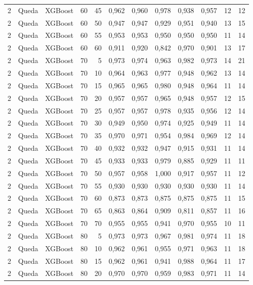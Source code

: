 \begin{longtable}{@{}rllrrrrrrrrr@{}}
2 & Queda & XGBoost & 60 & 45 & 0,962 & 0,960 & 0,978 & 0,938 & 0,957 & 12 & 12 \\
2 & Queda & XGBoost & 60 & 50 & 0,947 & 0,947 & 0,929 & 0,951 & 0,940 & 13 & 15 \\
2 & Queda & XGBoost & 60 & 55 & 0,953 & 0,953 & 0,950 & 0,950 & 0,950 & 11 & 14 \\
2 & Queda & XGBoost & 60 & 60 & 0,911 & 0,920 & 0,842 & 0,970 & 0,901 & 13 & 17 \\
2 & Queda & XGBoost & 70 & 5 & 0,973 & 0,974 & 0,963 & 0,982 & 0,973 & 14 & 21 \\
2 & Queda & XGBoost & 70 & 10 & 0,964 & 0,963 & 0,977 & 0,948 & 0,962 & 13 & 14 \\
2 & Queda & XGBoost & 70 & 15 & 0,965 & 0,965 & 0,980 & 0,948 & 0,964 & 11 & 14 \\
2 & Queda & XGBoost & 70 & 20 & 0,957 & 0,957 & 0,965 & 0,948 & 0,957 & 12 & 15 \\
2 & Queda & XGBoost & 70 & 25 & 0,957 & 0,957 & 0,978 & 0,935 & 0,956 & 12 & 14 \\
2 & Queda & XGBoost & 70 & 30 & 0,949 & 0,950 & 0,974 & 0,925 & 0,949 & 11 & 14 \\
2 & Queda & XGBoost & 70 & 35 & 0,970 & 0,971 & 0,954 & 0,984 & 0,969 & 12 & 14 \\
2 & Queda & XGBoost & 70 & 40 & 0,932 & 0,932 & 0,947 & 0,915 & 0,931 & 11 & 14 \\
2 & Queda & XGBoost & 70 & 45 & 0,933 & 0,933 & 0,979 & 0,885 & 0,929 & 11 & 11 \\
2 & Queda & XGBoost & 70 & 50 & 0,957 & 0,958 & 1,000 & 0,917 & 0,957 & 11 & 12 \\
2 & Queda & XGBoost & 70 & 55 & 0,930 & 0,930 & 0,930 & 0,930 & 0,930 & 11 & 14 \\
2 & Queda & XGBoost & 70 & 60 & 0,873 & 0,873 & 0,875 & 0,875 & 0,875 & 11 & 15 \\
2 & Queda & XGBoost & 70 & 65 & 0,863 & 0,864 & 0,909 & 0,811 & 0,857 & 11 & 16 \\
2 & Queda & XGBoost & 70 & 70 & 0,955 & 0,955 & 0,941 & 0,970 & 0,955 & 10 & 11 \\
2 & Queda & XGBoost & 80 & 5 & 0,973 & 0,973 & 0,967 & 0,981 & 0,974 & 11 & 18 \\
2 & Queda & XGBoost & 80 & 10 & 0,962 & 0,961 & 0,955 & 0,971 & 0,963 & 11 & 18 \\
2 & Queda & XGBoost & 80 & 15 & 0,962 & 0,961 & 0,941 & 0,988 & 0,964 & 11 & 17 \\
2 & Queda & XGBoost & 80 & 20 & 0,970 & 0,970 & 0,959 & 0,983 & 0,971 & 11 & 14 \\

\end{longtable}

